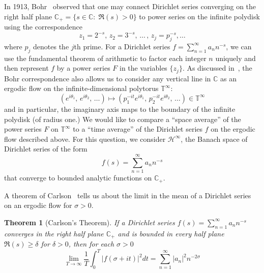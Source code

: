 \documentclass[]{elsarticle}
\newcommand{\T}{\mathbb{T}}
\newcommand{\C}{\mathbb{C}}
\newcommand{\ch}{\mathcal{H}}
\newcommand{\cplus}{\mathbb{C}_{+}}
\numberwithin{equation}{section}
\newtheorem{thm}[prop]{Theorem}
\begin{document}
  In 1913, Bohr~\cite{Bohr1913a} observed that one may connect Dirichlet series converging on the right half plane $\cplus = \{s \in \C:\; \Re(s)>0\}$ to power series on the infinite polydisk using the correspondence
    \begin{equation*}
      z_1 = 2^{-s},\,z_2 = 3^{-s},\, \dots\,,\, z_j = p_j^{-s}, \dots
    \end{equation*}
  where $p_j$ denotes the $j$th prime. For a Dirichlet series $f=\sum_{n=1}^\infty a_n n^{-s}$, we can use the fundamental theorem of arithmetic to factor each integer $n$ uniquely and then represent $f$ by a power series $F$ in the variables $\{z_j\}$.  As discussed in~\cite{SaksmanSeip2009}, the Bohr correspondence also allows us to consider any vertical line in $\C$ as an ergodic flow on the infinite-dimensional polytorus \(\T^\infty\):
    \begin{equation*}
      (e^{i\theta_1},\, e^{i\theta_2},\, \dots ) \mapsto (p_1^{-it} e^{i\theta_1},\, p_2^{-it}e^{i\theta_2},\, \dots) \in \T^\infty
    \end{equation*}
  and in particular, the imaginary axis maps to the boundary of the infinite polydisk (of radius one.) 
  We would like to compare a ``space average'' of the power series $F$ on $\T^\infty$ to a ``time average'' of the Dirichlet series $f$ on the ergodic flow described above. For this question, we consider $\ch^\infty$, the Banach space of Dirichlet series of the form 
    \begin{equation} \label{DS}
      f(s) = \sum_{n=1}^\infty a_n n^{-s}
    \end{equation} 
  that converge to bounded analytic functions on $\cplus$.

  A theorem of Carlson~\cite{Carlson1922} tells us about the limit in the mean of a Dirichlet series on an ergodic flow for $\sigma > 0$. 
    \begin{thm}[Carlson's Theorem] \label{thm:carlson} 
      If a Dirichlet series $f(s) = \sum_{n=1}^\infty a_n n^{-s}$ converges in the right half plane $\cplus$ and is bounded in every half plane $\Re(s)\geq\delta$ for $\delta > 0$, then for each $\sigma>0$
      \begin{equation}
        \lim_{T \to \infty} \frac{1}{T} \int_0^T |f(\sigma + it)|^2 dt = \sum_{n=1}^\infty |a_n|^2 n^{-2\sigma}
      \end{equation}
    \end{thm}
\end{document}
